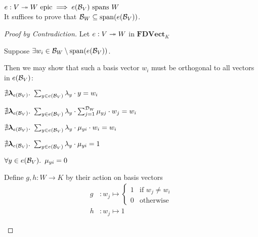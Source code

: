 \begin{lemma}\label{lemma:linear-map-epic-span}
  $e : V\twoheadrightarrow W \text{ epic} \implies e(\mathcal{B}_{V}) \text{ spans } W$\\[1em]
  It suffices to prove that $\mathcal{B}_{W} \subseteq \operatorname{span}(e(\mathcal{B}_{V}))$.

  \begin{proof}[Proof by Contradiction]
    Let $e : V \twoheadrightarrow W$ in $\mathbf{FDVect}_K$
    \begin{itemize}
      \step
        Suppose ${\exists w_i\in\mathcal{B}_{W}\setminus\operatorname{span}(e(\mathcal{B}_{V}))}$.
        \marginnote{\Hyp}

      \step
        Then we may show that such a basis vector $w_i$ must be orthogonal to all vectors in $e(\mathcal{B}_{V})$:

      \step
        \begin{itemize}
          \subp{\star}
            $\nexists \boldsymbol{\lambda}_{e(\mathcal{B}_{V})}\ldotp~\sum_{y\in e(\mathcal{B}_{V})} \lambda_y\cdot y = w_i$

          \step[\iffs]
            $\nexists \boldsymbol{\lambda}_{e(\mathcal{B}_{V})}\ldotp~\sum_{y\in e(\mathcal{B}_{V})} \lambda_y\cdot\sum_{j=1}^{\mathcal{D}_{W}}\mu_{yj}\cdot w_j = w_i$

          \step[\iffs]
            $\nexists \boldsymbol{\lambda}_{e(\mathcal{B}_{V})}\ldotp~\sum_{y\in e(\mathcal{B}_{V})} \lambda_y\cdot\mu_{yi}\cdot w_i = w_i$

          \step[\iffs]
            $\nexists \boldsymbol{\lambda}_{e(\mathcal{B}_{V})}\ldotp~\sum_{y\in e(\mathcal{B}_{V})} \lambda_y\cdot\mu_{yi} = 1$

          \step[\iffs]
            $\forall y \in e(\mathcal{B}_{V})\ldotp~\mu_{yi} = 0$
        \end{itemize}


      \step
        Define $g, h : W\to K$ by their action on basis vectors
        \begin{align*}
          g & : w_j \mapsto
          \begin{cases}
            1 & \text{if }w_j \neq w_i\\
            0 & \text{otherwise}
          \end{cases}\\
          h & : w_j \mapsto 1
        \end{align*}


\end{itemize}
\end{proof}
\end{lemma}

